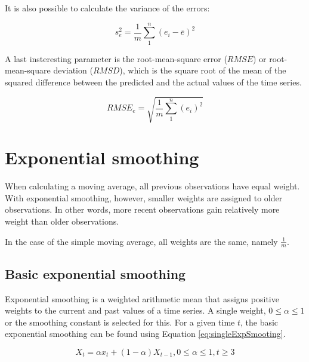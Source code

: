 It is also possible to calculate the variance of the errors:

\begin{definition}[$VAR$]
\begin{equation}
	s^{2}_{e} = \frac{1}{m} \sum_{1}^{n} (e_{i} - \overline{e})^{2}
\label{eq:varError}
\end{equation}
\end{definition}


A last insteresting parameter is the root-mean-square error ($RMSE$) or root-mean-square deviation ($RMSD$), which is the square root of the mean of the squared difference between the predicted and the actual values of the time series.

\begin{definition}[$RMSE$]
  \begin{equation}
    RMSE_{e} = \sqrt{\frac{1}{m} \sum_{1}^{n} (e_{i})^{2}}
  \label{eq:varError2}
  \end{equation}
\end{definition}

\section{Exponential smoothing}

When calculating a moving average, all previous observations have equal weight. With exponential smoothing, however, smaller weights are assigned to older observations. In other words, more recent observations gain relatively more weight than older observations.

In the case of the simple moving average, all weights are the same, namely $\frac{1}{m}$.

\subsection{Basic exponential smoothing}

Exponential smoothing is a weighted arithmetic mean that assigns positive weights to the current and past values of a time series. A single weight, $0\leq \alpha \leq1$ or the smoothing constant is selected for this. For a given time $t$, the basic exponential smoothing can be found using Equation \ref{eq:singleExpSmooting}.

\begin{definition}
  \begin{equation}
    X_{t} = \alpha x_{t} + (1-\alpha)X_{t-1}, 0 \leq \alpha \leq 1, t \geq 3
  \label{eq:singleExpSmooting}
  \end{equation}
\end{definition}

